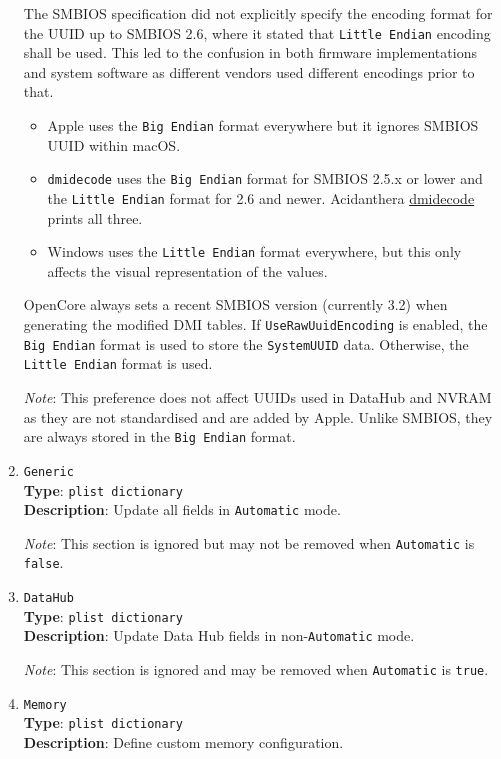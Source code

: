 \documentclass[]{article}
\providecommand{\tightlist}{%
  \setlength{\itemsep}{0pt}\setlength{\parskip}{0pt}}
\begin{document}
\begin{enumerate}
  The SMBIOS specification did not explicitly specify the encoding format for the
  UUID up to SMBIOS 2.6, where it stated that \texttt{Little Endian} encoding
  shall be used. This led to the confusion in both firmware implementations
  and system software as different vendors used different encodings prior to that.

  \begin{itemize}
    \tightlist
    \item Apple uses the \texttt{Big Endian} format everywhere but it ignores SMBIOS UUID within macOS.
    \item \texttt{dmidecode} uses the \texttt{Big Endian} format for SMBIOS 2.5.x or lower
    and the \texttt{Little Endian} format for 2.6 and newer. Acidanthera
    \href{https://github.com/acidanthera/dmidecode}{dmidecode} prints all three.
    \item Windows uses the \texttt{Little Endian} format everywhere, but this only affects
    the visual representation of the values.
  \end{itemize}

  OpenCore always sets a recent SMBIOS version (currently 3.2) when generating
  the modified DMI tables. If \texttt{UseRawUuidEncoding} is enabled, the \texttt{Big Endian}
  format is used to store the \texttt{SystemUUID} data. Otherwise, the \texttt{Little Endian}
  format is used.

  \emph{Note}: This preference does not affect UUIDs used in DataHub and NVRAM
  as they are not standardised and are added by Apple. Unlike SMBIOS, they are
  always stored in the \texttt{Big Endian} format.

\item
  \texttt{Generic}\\
  \textbf{Type}: \texttt{plist\ dictionary}\\
  \textbf{Description}: Update all fields in \texttt{Automatic} mode.

  \emph{Note}: This section is ignored but may not be removed when
  \texttt{Automatic} is \texttt{false}.
\item
  \texttt{DataHub}\\
  \textbf{Type}: \texttt{plist\ dictionary}\\
  \textbf{Description}: Update Data Hub fields in non-\texttt{Automatic} mode.

  \emph{Note}: This section is ignored and may be removed when
  \texttt{Automatic} is \texttt{true}.
\item
  \texttt{Memory}\\
  \textbf{Type}: \texttt{plist\ dictionary}\\
  \textbf{Description}: Define custom memory configuration.


\end{enumerate}
\end{document}
